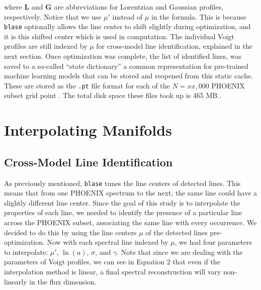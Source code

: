 \documentclass[twocolumn]{aastex631}
\begin{document}
where $\mathbf{L}$ and $\mathbf{G}$ are abbreviations for Lorentzian and 
Gaussian profiles, respectively. Notice that we use $\mu'$ instead of $\mu$ 
in the formula. This is because \texttt{blase} optionally allows the line center to shift 
slightly during optimization, and it is this shifted center which is used in 
computation. The individual Voigt profiles are still indexed by $\mu$ for 
cross-model line identification, explained in the next section. Once optimization 
was complete, the list of identified lines, was saved to a so-called ``state dictionary'' a common representation for pre-trained machine learning models that can be stored and reopened from this static cache.  These are stored as the \texttt{.pt} file format for each of the $N=xx,000$ PHOENIX subset 
grid point \citep{pytorch}. The total disk space these files took up is 465 MB..


\section{Interpolating Manifolds}
\subsection{Cross-Model Line Identification}
As previously mentioned, \texttt{blase} tunes the line centers of
detected lines. This means that from one PHOENIX spectrum to the next, the
same line could have a slightly different line center. Since the goal of this
study is to interpolate the properties of each line, we needed to identify the
presence of a particular line across the PHOENIX subset, associating the same line with every occurrence. We decided to do
this by using the line centers $\mu$ of the detected lines pre-optimization. 
Now with each spectral line indexed by $\mu$, we had four parameters to interpolate:
$\mu'$, $\ln(a)$, $\sigma$, and $\gamma$. Note that since we are dealing with 
the parameters of Voigt profiles, we can see in Equation 2 that even if the 
interpolation method is linear, a final spectral reconstruction will vary 
non-linearly in the flux dimension.
\end{document}
